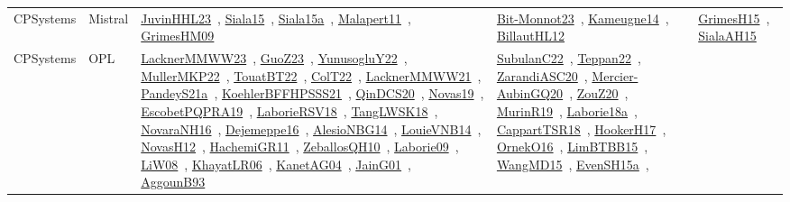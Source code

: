 {\begin{longtable}{lp{3cm}>{\raggedright\arraybackslash}p{6cm}>{\raggedright\arraybackslash}p{6cm}>{\raggedright\arraybackslash}p{8cm}}
CPSystems & Mistral & \href{../works/JuvinHHL23.pdf}{JuvinHHL23}~\cite{JuvinHHL23}, \href{../works/Siala15.pdf}{Siala15}~\cite{Siala15}, \href{../works/Siala15a.pdf}{Siala15a}~\cite{Siala15a}, \href{../works/Malapert11.pdf}{Malapert11}~\cite{Malapert11}, \href{../works/GrimesHM09.pdf}{GrimesHM09}~\cite{GrimesHM09} & \href{../works/Bit-Monnot23.pdf}{Bit-Monnot23}~\cite{Bit-Monnot23}, \href{../works/Kameugne14.pdf}{Kameugne14}~\cite{Kameugne14}, \href{../works/BillautHL12.pdf}{BillautHL12}~\cite{BillautHL12} & \href{../works/GrimesH15.pdf}{GrimesH15}~\cite{GrimesH15}, \href{../works/SialaAH15.pdf}{SialaAH15}~\cite{SialaAH15}\\
CPSystems & OPL & \href{../works/LacknerMMWW23.pdf}{LacknerMMWW23}~\cite{LacknerMMWW23}, \href{../works/GuoZ23.pdf}{GuoZ23}~\cite{GuoZ23}, \href{../works/YunusogluY22.pdf}{YunusogluY22}~\cite{YunusogluY22}, \href{../works/MullerMKP22.pdf}{MullerMKP22}~\cite{MullerMKP22}, \href{../works/TouatBT22.pdf}{TouatBT22}~\cite{TouatBT22}, \href{../works/ColT22.pdf}{ColT22}~\cite{ColT22}, \href{../works/LacknerMMWW21.pdf}{LacknerMMWW21}~\cite{LacknerMMWW21}, \href{../works/PandeyS21a.pdf}{PandeyS21a}~\cite{PandeyS21a}, \href{../works/KoehlerBFFHPSSS21.pdf}{KoehlerBFFHPSSS21}~\cite{KoehlerBFFHPSSS21}, \href{../works/QinDCS20.pdf}{QinDCS20}~\cite{QinDCS20}, \href{../works/Novas19.pdf}{Novas19}~\cite{Novas19}, \href{../works/EscobetPQPRA19.pdf}{EscobetPQPRA19}~\cite{EscobetPQPRA19}, \href{../works/LaborieRSV18.pdf}{LaborieRSV18}~\cite{LaborieRSV18}, \href{../works/TangLWSK18.pdf}{TangLWSK18}~\cite{TangLWSK18}, \href{../works/NovaraNH16.pdf}{NovaraNH16}~\cite{NovaraNH16}, \href{../works/Dejemeppe16.pdf}{Dejemeppe16}~\cite{Dejemeppe16}, \href{../works/AlesioNBG14.pdf}{AlesioNBG14}~\cite{AlesioNBG14}, \href{../works/LouieVNB14.pdf}{LouieVNB14}~\cite{LouieVNB14}, \href{../works/NovasH12.pdf}{NovasH12}~\cite{NovasH12}, \href{../works/HachemiGR11.pdf}{HachemiGR11}~\cite{HachemiGR11}, \href{../works/ZeballosQH10.pdf}{ZeballosQH10}~\cite{ZeballosQH10}, \href{../works/Laborie09.pdf}{Laborie09}~\cite{Laborie09}, \href{../works/LiW08.pdf}{LiW08}~\cite{LiW08}, \href{../works/KhayatLR06.pdf}{KhayatLR06}~\cite{KhayatLR06}, \href{../works/KanetAG04.pdf}{KanetAG04}~\cite{KanetAG04}, \href{../works/JainG01.pdf}{JainG01}~\cite{JainG01}, \href{../works/AggounB93.pdf}{AggounB93}~\cite{AggounB93} & \href{../works/SubulanC22.pdf}{SubulanC22}~\cite{SubulanC22}, \href{../works/Teppan22.pdf}{Teppan22}~\cite{Teppan22}, \href{../works/ZarandiASC20.pdf}{ZarandiASC20}~\cite{ZarandiASC20}, \href{../works/Mercier-AubinGQ20.pdf}{Mercier-AubinGQ20}~\cite{Mercier-AubinGQ20}, \href{../works/ZouZ20.pdf}{ZouZ20}~\cite{ZouZ20}, \href{../works/MurinR19.pdf}{MurinR19}~\cite{MurinR19}, \href{../works/Laborie18a.pdf}{Laborie18a}~\cite{Laborie18a}, \href{../works/CappartTSR18.pdf}{CappartTSR18}~\cite{CappartTSR18}, \href{../works/HookerH17.pdf}{HookerH17}~\cite{HookerH17}, \href{../works/OrnekO16.pdf}{OrnekO16}~\cite{OrnekO16}, \href{../works/LimBTBB15.pdf}{LimBTBB15}~\cite{LimBTBB15}, \href{../works/WangMD15.pdf}{WangMD15}~\cite{WangMD15}, \href{../works/EvenSH15a.pdf}{EvenSH15a}~\cite{EvenSH15a}, 
\end{longtable}}
